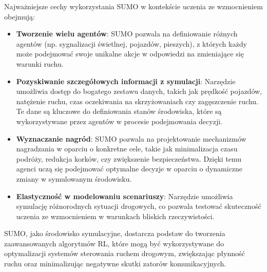 \documentclass[12pt, a4paper]{article} %
\begin{document}
    Najważniejsze cechy wykorzystania SUMO w kontekście uczenia ze wzmocnieniem obejmują:

    \begin{itemize}
        \item \textbf{Tworzenie wielu agentów}:
        SUMO pozwala na definiowanie różnych agentów (np. sygnalizacji świetlnej, pojazdów, pieszych), z których każdy
        może podejmować swoje unikalne akcje w odpowiedzi na zmieniające się warunki ruchu.
        \item \textbf{Pozyskiwanie szczegółowych informacji z symulacji}:
        Narzędzie umożliwia dostęp do bogatego zestawu danych, takich jak prędkość pojazdów, natężenie ruchu, czas
        oczekiwania na skrzyżowaniach czy zagęszczenie ruchu. Te dane są kluczowe do definiowania stanów środowiska,
        które są wykorzystywane przez agentów w procesie podejmowania decyzji.

        \item \textbf{Wyznaczanie nagród}:
        SUMO pozwala na projektowanie mechanizmów nagradzania w oparciu o konkretne cele, takie jak minimalizacja czasu
        podróży, redukcja korków, czy zwiększenie bezpieczeństwa. Dzięki temu agenci uczą się podejmować optymalne
        decyzje w oparciu o dynamiczne zmiany w symulowanym środowisku.

        \item \textbf{Elastyczność w modelowaniu scenariuszy}:
        Narzędzie umożliwia symulację różnorodnych sytuacji drogowych, co pozwala testować skuteczność uczenia ze
        wzmocnieniem w warunkach bliskich rzeczywistości.
    \end{itemize}

    SUMO, jako środowisko symulacyjne, dostarcza podstaw do tworzenia zaawansowanych algorytmów RL, które mogą być
    wykorzystywane do optymalizacji systemów sterowania ruchem drogowym, zwiększając płynność ruchu oraz minimalizując
    negatywne skutki zatorów komunikacyjnych.
\end{document}
